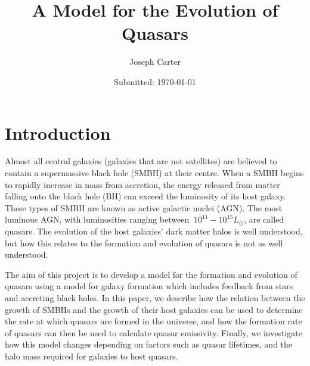 \documentclass[12pt, twocolumn]{article}%
\begin{document}
                     

\title{A Model for the Evolution of Quasars} 
\date{Submitted: \today{}}
\author{Joseph Carter}

 



\maketitle
\onecolumngrid


\tableofcontents
\newpage
\twocolumngrid


\section{Introduction}

Almost all central galaxies (galaxies that are not satellites) are believed to contain a supermassive black hole (SMBH) at their centre. When a SMBH begins to rapidly increase in mass from accretion, the energy released from matter falling onto the black hole (BH) can exceed the luminosity of its host galaxy. These types of SMBH are known as active galactic nuclei (AGN). The most luminous AGN, with luminosities ranging between $~10^{11} - 10^{15}L_\odot$, are called quasars. The evolution of the host galaxies' dark matter halos is well understood, but how this relates to the formation and evolution of quasars is not as well understood.\par

The aim of this project is to develop a model for the formation and evolution of quasars using a model for galaxy formation which includes feedback from stars and accreting black holes. In this paper, we describe how the relation between the growth of SMBHs and the growth of their host galaxies can be used to determine the rate at which quasars are formed in the universe, and how the formation rate of quasars can then be used to calculate quasar emissivity. Finally, we investigate how this model changes depending on factors such as quasar lifetimes, and the halo mass required for galaxies to host quasars.
\end{document}
